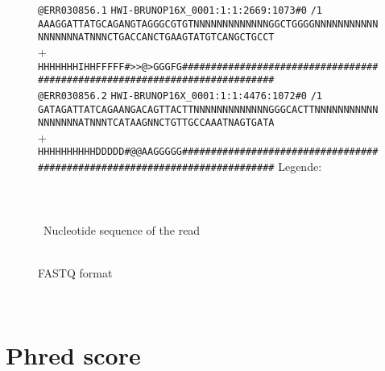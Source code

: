 \begin{figure}[!htbp]
\begin{minipage}[adjusting]{\textwidth}
{\small
{\color[rgb]{0.447059,0.678431,0.274510}\verb!@ERR030856.1!}
{\color[rgb]{0.500000,0.500000,0.500000}\verb!HWI-BRUNOP16X_0001:1:1:2669:1073#0!}%
{\color[rgb]{1.000000,0.000000,0.000000}\verb!/1!}\\
\verb!AAAGGATTATGCAGANGTAGGGCGTGTNNNNNNNNNNNNNGGCTGGGGNNNNNNNNNNNNNNNNNNATNNNCTGACCANCTGAAGTATGTCANGCTGCCT!\\
{\color[rgb]{0.698039,0.145098,0.450980}+}\\
{\color[rgb]{0.000000,0.000000,0.555711}\verb!HHHHHHHIHHFFFFF#>>@>GGGFG###########################################################################!}\\
{\color[rgb]{0.447059,0.678431,0.274510}\verb!@ERR030856.2!}
{\color[rgb]{0.500000,0.500000,0.500000}\verb!HWI-BRUNOP16X_0001:1:1:4476:1072#0!}%
{\color[rgb]{1.000000,0.000000,0.000000}\verb!/1!}\\
\verb!GATAGATTATCAGAANGACAGTTACTTNNNNNNNNNNNNNGGGCACTTNNNNNNNNNNNNNNNNNNATNNNTCATAAGNNCTGTTGCCAAATNAGTGATA!\\
{\color[rgb]{0.698039,0.145098,0.450980}+}\\
{\color[rgb]{0.000000,0.000000,0.555711}\verb!HHHHHHHHHHDDDDD#@@AAGGGGG###########################################################################!}
}
{\footnotesize
Legende:\\
\\
\\
\\
\quad\textbullet\ Nucleotide sequence of the read\\
\\
}
\end{minipage}
\caption{FASTQ format}\label{fig:fastqFormat}
\end{figure}

\FloatBarrier\

\section{Phred score}\label{sec:PhredScore}

